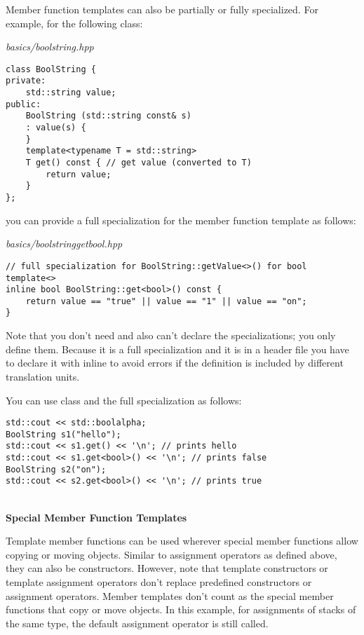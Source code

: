 Member function templates can also be partially or fully specialized. For example, for the following class:

\noindent
\textit{basics/boolstring.hpp}
\begin{lstlisting}[style=styleCXX]
class BoolString {
private:
	std::string value;
public:
	BoolString (std::string const& s)
	: value(s) {
	}
	template<typename T = std::string>
	T get() const { // get value (converted to T)
		return value;
	}
};
\end{lstlisting}

you can provide a full specialization for the member function template as follows:

\noindent
\textit{basics/boolstringgetbool.hpp}
\begin{lstlisting}[style=styleCXX]
// full specialization for BoolString::getValue<>() for bool
template<>
inline bool BoolString::get<bool>() const {
	return value == "true" || value == "1" || value == "on";
}
\end{lstlisting}

Note that you don’t need and also can’t declare the specializations; you only define them. Because it is a full specialization and it is in a header file you have to declare it with inline to avoid errors if the definition is included by different translation units.

You can use class and the full specialization as follows:

\begin{lstlisting}[style=styleCXX]
std::cout << std::boolalpha;
BoolString s1("hello");
std::cout << s1.get() << '\n'; // prints hello
std::cout << s1.get<bool>() << '\n'; // prints false
BoolString s2("on");
std::cout << s2.get<bool>() << '\n'; // prints true
\end{lstlisting}

\hspace*{\fill} \\ %
\noindent
\textbf{Special Member Function Templates}

Template member functions can be used wherever special member functions allow copying or moving objects. Similar to assignment operators as defined above, they can also be constructors. However, note that template constructors or template assignment operators don’t replace predefined constructors or assignment operators. Member templates don’t count as the special member functions that copy or move objects. In this example, for assignments of stacks of the same type, the default assignment operator is still called.

